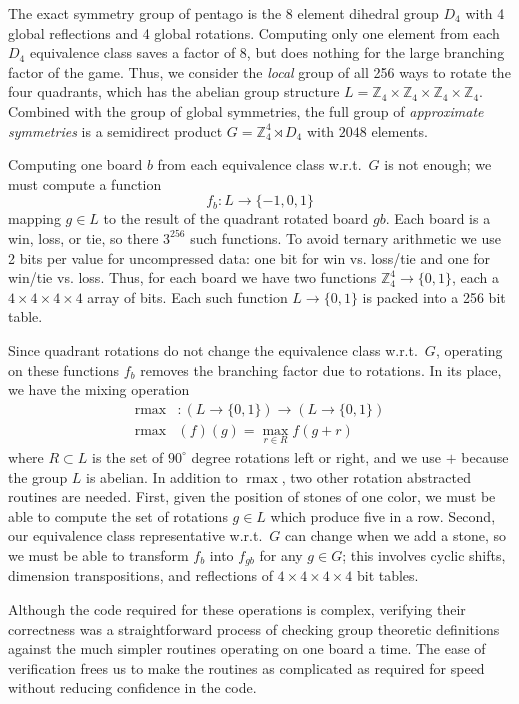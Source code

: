 \documentclass[conference]{IEEEtran}
\newcommand{\Z}{\mathbb{Z}}
\newcommand{\wrt}{w.\thinspace r.\thinspace t.\ }
\DeclareMathOperator{\rmax}{rmax}
\begin{document}
The exact symmetry group of pentago is the 8 element dihedral group $D_4$ with 4 global reflections and
4 global rotations.  Computing only one element from each $D_4$ equivalence class saves a factor of $8$,
but does nothing for the large branching factor of the game.  Thus, we consider the \emph{local} group of
all 256 ways to rotate the four quadrants, which has the abelian group structure
$L = \Z_4 \times \Z_4 \times \Z_4 \times \Z_4$.
Combined with the group of global symmetries, the full group of \emph{approximate symmetries} is a semidirect product
$G = \Z_4^4 \rtimes D_4$ with $2048$ elements.

Computing one board $b$ from each equivalence class \wrt $G$ is not enough; we must compute a function
$$f_b : L \to \{-1,0,1\}$$
mapping $g \in L$ to the result of the quadrant rotated board $gb$.  Each board is a win,
loss, or tie, so there $3^{256}$ such functions.  To avoid ternary arithmetic we use 2 bits per value for
uncompressed data: one bit for win vs. loss/tie and one for win/tie vs. loss.  Thus, for each board we have two
functions $\Z_4^4 \to \{0,1\}$, each a $4 \times 4 \times 4 \times 4$ array of bits.  Each such function
$L \to \{0,1\}$ is packed into a 256 bit table.

Since quadrant rotations do not change the equivalence class \wrt $G$, operating on these functions $f_b$ removes
the branching factor due to rotations.  In its place, we have the mixing operation
\begin{align*}
\rmax &: \left(L \to \{0,1\}\right) \to \left(L \to \{0,1\}\right) \\
\rmax&(f)(g) = \max_{r \in R} f(g+r)
\end{align*}
where $R \subset L$ is the set of $90^\circ$ degree rotations left or right, and we use $+$ because the
group $L$ is abelian.  In addition to $\rmax$, two other rotation abstracted routines are needed.
First, given the position of stones of one color, we must be able to compute the set of rotations
$g \in L$ which produce five in a row.  Second, our equivalence class representative \wrt $G$ can change
when we add a stone, so we must be able to transform $f_b$ into $f_{gb}$ for any $g \in G$; this
involves cyclic shifts, dimension transpositions, and reflections of $4 \times 4 \times 4 \times 4$ bit tables.

Although the code required for these operations is complex, verifying their correctness was a
straightforward process of checking group theoretic definitions against the much simpler routines
operating on one board a time.  The ease of verification frees us to make the routines as complicated as required
for speed without reducing confidence in the code.
\end{document}
